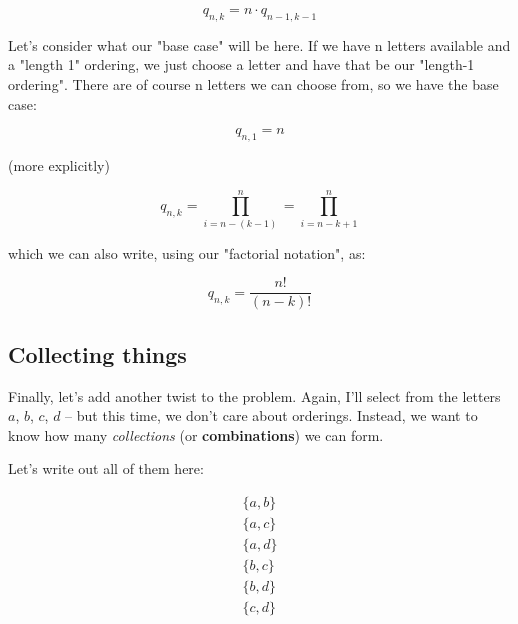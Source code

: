 \begin{equation*}
q_{n,k} = n \cdot q_{n-1,k-1}
\end{equation*}

Let's consider what our "base case" will be here. If we have n letters available and a "length 1" ordering, we just choose a letter and have that be our "length-1 ordering". There are of course n letters we can choose from, so we have the base case: 

\begin{equation*}
q_{n,1} = n
\end{equation*}



(more explicitly)

\begin{equation*}
q_{n,k} = \prod_{i=n-(k-1)}^n = \prod_{i=n-k+1}^n
\end{equation*}


which we can also write, using our "factorial notation", as:

\begin{equation}
\label{eq:perms-n-k}
q_{n,k} = \frac{n!}{(n-k)!}
\end{equation}



\subsection{Collecting things}

Finally, let's add another twist to the problem. Again, I'll select from the letters $a$, $b$, $c$, $d$ -- but this time, we don't care about orderings. Instead, we want to know how many \textit{collections} (or \textbf{combinations}) we can form. 

Let's write out all of them here:

\begin{gather*}
\{a, b\} \\
\{a, c\} \\
\{a, d\} \\
\{b, c\} \\
\{b, d\} \\
\{c, d\} \\
\end{gather*}

